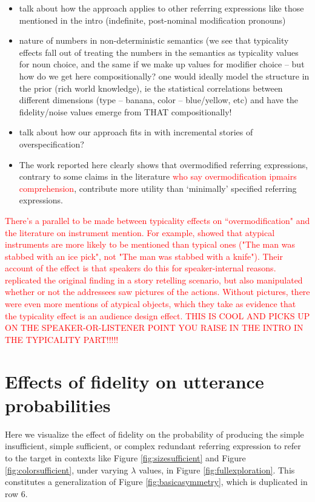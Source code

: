 \documentclass[11pt]{article}
\newcommand{\red}[1]{\textcolor{Red}{#1}}
\newcommand{\figref}[1]{Figure \ref{#1}}
\begin{document}
\begin{itemize}
	\item talk about how the approach applies to other referring expressions like those mentioned in the intro (indefinite, post-nominal modification pronouns)
	\item nature of numbers in non-deterministic semantics (we see that typicality effects fall out of treating the numbers in the semantics as typicality values for noun choice, and the same if we make up values for modifier choice -- but how do we get here compositionally? one would ideally model the structure in the prior (rich world knowledge), ie the statistical correlations between different dimensions (type -- banana, color -- blue/yellow, etc) and have the fidelity/noise values emerge from THAT compositionally!
	\item talk about how our approach fits in with incremental stories of overspecification?
	\item The work reported here clearly shows that overmodified referring expressions, contrary to some claims in the literature \cite{Engelhardt2011} \red{who say overmodification ipmairs comprehension}, contribute more utility than `minimally' specified referring expressions.
\end{itemize}
%
\red{There's a parallel to be made between typicality effects on ``overmodification" and the literature on instrument mention. For example, \cite{brown1987} showed that atypical instruments are more likely to be mentioned than typical ones ("The man was stabbed with an ice pick", not "The man was stabbed with a knife"). Their account of the effect is that speakers do this for speaker-internal reasons. \cite{lockridge2002} replicated the original finding in a story retelling scenario, but also manipulated whether or not the addressees saw pictures of the actions. Without pictures, there were even more mentions of atypical objects, which they take as evidence that the typicality effect is an audience design effect. THIS IS COOL AND PICKS UP ON THE SPEAKER-OR-LISTENER POINT YOU RAISE IN THE INTRO IN THE TYPICALITY PART!!!!!}
%
\appendix

\section{Effects of fidelity on utterance probabilities}
\label{app:modelexploration}

Here we visualize the effect of fidelity on the probability of producing the simple insufficient, simple sufficient, or complex redundant referring expression to refer to the target in contexts like  \figref{fig:sizesufficient} and \figref{fig:colorsufficient}, under varying $\lambda$ values, in \figref{fig:fullexploration}. This constitutes a generalization of \figref{fig:basicasymmetry}, which is duplicated in row 6.
\end{document}
